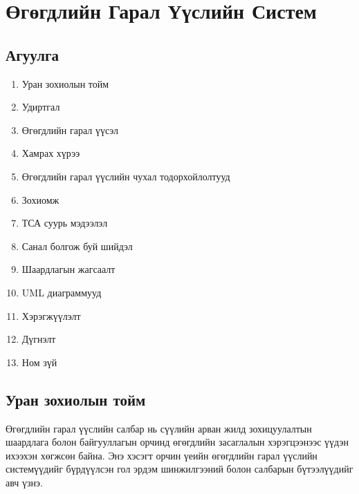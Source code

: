 
\section{Өгөгдлийн Гарал Үүслийн Систем}
\label{sec:data_lineage_system}

\subsection*{Агуулга}
\begin{enumerate}
    \item Уран зохиолын тойм
    \item Удиртгал
    \item Өгөгдлийн гарал үүсэл
    \item Хамрах хүрээ
    \item Өгөгдлийн гарал үүслийн чухал тодорхойлолтууд
    \item Зохиомж
    \item ТСА суурь мэдээлэл
    \item Санал болгож буй шийдэл
    \item Шаардлагын жагсаалт
    \item UML диаграммууд
    \item Хэрэгжүүлэлт
    \item Дүгнэлт
    \item Ном зүй
\end{enumerate}

\hrulefill

\subsection{Уран зохиолын тойм}
\label{subsec:literature_survey}

Өгөгдлийн гарал үүслийн салбар нь сүүлийн арван жилд зохицуулалтын шаардлага болон байгууллагын орчинд өгөгдлийн засаглалын хэрэгцээнээс үүдэн ихээхэн хөгжсөн байна. Энэ хэсэгт орчин үеийн өгөгдлийн гарал үүслийн системүүдийг бүрдүүлсэн гол эрдэм шинжилгээний болон салбарын бүтээлүүдийг авч үзнэ.

